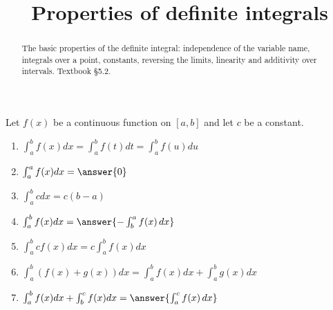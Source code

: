 \documentclass{ximera}
\title{Properties of definite integrals}
\begin{document}
\begin{abstract}
The basic properties of the definite integral: independence of the variable name, integrals over a point, constants, reversing the limits, linearity and additivity over intervals. Textbook §5.2.
\end{abstract}
\maketitle

\begin{proposition}\label{proposition:12-12}
Let $f(x)$ be a continuous function on $[a, b]$ and let $c$ be a constant.
\begin{enumerate}
  \item $\int_{a}^{b} f(x) d x=\int_{a}^{b} f(t) d t=\int_{a}^{b} f(u) d u$
  \item $\int_{a}^{a} f(x) d x=\answer{0}$
  \item $\int_{a}^{b} c d x=c(b-a)$
  \item $\int_{a}^{b} f(x) d x=\answer{-\int_{b}^{a} f(x)\,dx}$
  \item $\int_{a}^{b} c f(x) d x=c \int_{a}^{b} f(x) d x$
  \item $\int_{a}^{b}(f(x)+g(x)) d x=\int_{a}^{b} f(x) d x+\int_{a}^{b} g(x) d x$
  \item $\int_{a}^{b} f(x) d x+\int_{b}^{c} f(x) d x=\answer{\int_{a}^{c} f(x)\,dx}$
\end{enumerate}
\end{proposition}
\end{document}
